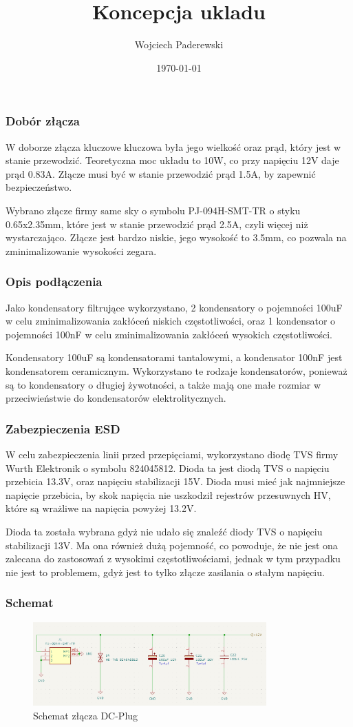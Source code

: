 \documentclass[../../main.tex]{subfiles}
\author{Wojciech Paderewski}
\date{\today}
\title{Koncepcja ukladu}
\begin{document}
\subsubsection{Dobór złącza}
W doborze złącza kluczowe kluczowa była jego wielkość oraz prąd, który jest w stanie przewodzić. Teoretyczna moc układu to 10W,
co przy napięciu 12V daje prąd 0.83A. Złącze musi być w stanie przewodzić prąd 1.5A, by zapewnić bezpieczeństwo. 

Wybrano złącze firmy same sky o symbolu PJ-094H-SMT-TR o styku 0.65x2.35mm, które jest w stanie przewodzić prąd 2.5A, czyli więcej niż wystarczająco.
Złącze jest bardzo niskie, jego wysokość to 3.5mm, co pozwala na zminimalizowanie wysokości zegara.
\subsubsection{Opis podłączenia}
Jako kondensatory filtrujące wykorzystano, 2 kondensatory o 
pojemności 100uF w celu zminimalizowania zakłóceń niskich częstotliwości, oraz 1 kondensator o pojemności 100nF w celu zminimalizowania zakłóceń wysokich częstotliwości.

Kondensatory 100uF są kondensatorami tantalowymi, a kondensator 100nF jest kondensatorem ceramicznym. Wykorzystano te rodzaje kondensatorów, 
ponieważ są to kondensatory o długiej żywotności, a także mają one małe rozmiar w przeciwieństwie do kondensatorów elektrolitycznych.
\subsubsection{Zabezpieczenia ESD}
W celu zabezpieczenia linii przed przepięciami, wykorzystano diodę TVS firmy Wurth Elektronik o symbolu 824045812. Dioda ta jest diodą TVS o napięciu przebicia 13.3V,
oraz napięciu stabilizacji 15V. Dioda musi mieć jak najmniejsze napięcie przebicia, by skok napięcia nie uszkodził rejestrów przesuwnych HV, które są wrażliwe na napięcia powyżej 13.2V.

Dioda ta została wybrana gdyż nie udało się znaleźć diody TVS o napięciu stabilizacji 13V. Ma ona również dużą pojemność, co powoduje, że nie jest ona zalecana do 
zastosowań z wysokimi częstotliwościami, jednak w tym przypadku nie jest to problemem, gdyż jest to tylko złącze zasilania o stałym napięciu.
\subsubsection{Schemat}
\begin{figure}[H]
    \centering
    \includegraphics[width=0.8\textwidth]{DcPlug_schemat.png}
    \caption{Schemat złącza DC-Plug}
\end{figure}
\end{document}
